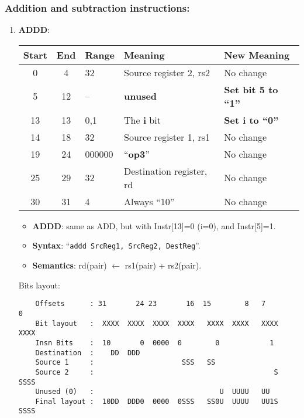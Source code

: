 \subsubsection{Addition and subtraction instructions:}
\label{sec:add:sub:insn:impl}
\begin{enumerate}
\item \textbf{ADDD}:\\
  \begin{center}
    \begin{tabular}[p]{|c|c|l|l|l|}
      \hline
      \textbf{Start} & \textbf{End} & \textbf{Range} & \textbf{Meaning} &
                                                                          \textbf{New Meaning}\\
      \hline
      0 & 4 & 32 & Source register 2, rs2 & No change \\
      5 & 12 & -- & \textbf{unused} & \textbf{Set bit 5 to ``1''} \\
      13 & 13 & 0,1 & The \textbf{i} bit & \textbf{Set i to ``0''} \\
      14 & 18 & 32 & Source register 1, rs1 & No change \\
      19 & 24 & 000000 & ``\textbf{op3}'' & No change \\
      25 & 29 & 32 & Destination register, rd & No change \\
      30 & 31 & 4 & Always ``10'' & No change \\
      \hline
    \end{tabular}
  \end{center}
  \begin{itemize}
  \item []\textbf{ADDD}: same as ADD, but with Instr[13]=0 (i=0), and
    Instr[5]=1.
  \item []\textbf{Syntax}: ``\texttt{addd  SrcReg1, SrcReg2, DestReg}''.
  \item []\textbf{Semantics}: rd(pair) $\leftarrow$ rs1(pair) + rs2(pair).
  \end{itemize}
  Bits layout:
\begin{verbatim}
    Offsets      : 31       24 23       16  15        8   7        0
    Bit layout   :  XXXX  XXXX  XXXX  XXXX   XXXX  XXXX   XXXX  XXXX
    Insn Bits    :  10       0  0000  0        0            1       
    Destination  :    DD  DDD                                       
    Source 1     :                     SSS   SS
    Source 2     :                                           S  SSSS
    Unused (0)   :                              U  UUUU   UU        
    Final layout :  10DD  DDD0  0000  0SSS   SS0U  UUUU   UU1S  SSSS
\end{verbatim}


\end{enumerate}
